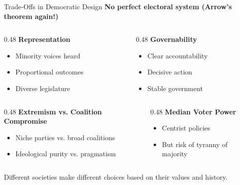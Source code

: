 \documentclass[10pt]{beamer}
\begin{document}
\begin{frame}{Trade-Offs in Democratic Design}
\textbf{No perfect electoral system (Arrow's theorem again!)}


\begin{columns}
\begin{column}{0.48\textwidth}
\textbf{Representation}
\begin{itemize}
\item Minority voices heard
\item Proportional outcomes
\item Diverse legislature
\end{itemize}
\end{column}


\begin{column}{0.48\textwidth}
\textbf{Governability}
\begin{itemize}
\item Clear accountability
\item Decisive action
\item Stable government
\end{itemize}
\end{column}
\end{columns}



\begin{columns}
\begin{column}{0.48\textwidth}
\textbf{Extremism vs. Coalition Compromise}
\begin{itemize}
\item Niche parties vs. broad coalitions
\item Ideological purity vs. pragmatism
\end{itemize}
\end{column}


\begin{column}{0.48\textwidth}
\textbf{Median Voter Power}
\begin{itemize}
\item Centrist policies
\item But risk of tyranny of majority
\end{itemize}
\end{column}
\end{columns}



\alert{Different societies make different choices based on their values and history.}
\end{frame}
\end{document}
